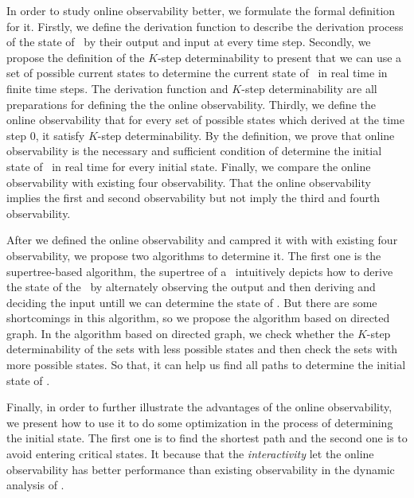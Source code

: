 In order to study online observability better, we formulate the formal definition for it. Firstly, we define the derivation function to describe the derivation process of the state of \BCNs\ by their output and input at every time step. Secondly, we propose the definition of the $K$-step determinability to present that we can use a set of possible current states to determine the current state of \BCNs\ in real time in finite time steps. The derivation function and $K$-step determinability are all preparations for defining the the online observability. Thirdly, we define the online observability that for every set of possible states which derived at the time step $0$, it satisfy $K$-step determinability. By the definition, we prove that online observability is the necessary and sufficient condition of determine the initial state of \BCNs\ in real time for every initial state. Finally, we compare the online observability with existing four observability. That the online observability implies the first and second observability but not imply the third and fourth observability.

After we defined the online observability and campred it with with existing four observability, we propose two algorithms to determine it. The first one is the supertree-based algorithm, the supertree of a \BCN\ intuitively depicts how to derive the state of the \BCN\ by alternately observing the output and then deriving and deciding the input untill we can determine the state of \BCN. But there are some shortcomings in this algorithm, so we propose the algorithm based on directed graph. In the algorithm based on directed graph, we check whether the $K$-step determinability of the sets with less possible states and then check the sets with more possible states. So that, it can help us find all paths to determine the initial state of \BCNs.

Finally, in order to further illustrate the advantages of the online observability, we present how to use it to do some optimization in the process of determining the initial state. The first one is to find the shortest path and the second one is to avoid entering critical states. It because that the {\em interactivity} let the online observability has better performance than existing observability in the dynamic analysis of \BCNs.

